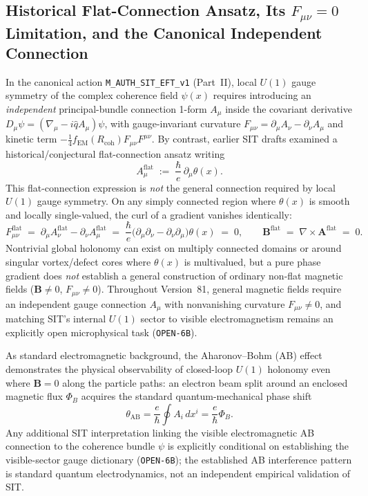 \subsection{Historical Flat-Connection Ansatz, Its $F_{\mu\nu} = 0$ Limitation, and the Canonical Independent Connection}

In the canonical action \texttt{M\_AUTH\_SIT\_EFT\_v1} (Part~II), local $U(1)$ gauge symmetry of the complex coherence field $\psi(x)$ requires introducing an \emph{independent} principal-bundle connection 1-form $A_\mu$ inside the covariant derivative $D_\mu\psi = (\nabla_\mu - i\hat{q}A_\mu)\psi$, with gauge-invariant curvature $F_{\mu\nu} = \partial_\mu A_\nu - \partial_\nu A_\mu$ and kinetic term $-\frac{1}{4}f_{\mathrm{EM}}(R_{\mathrm{coh}})F_{\mu\nu}F^{\mu\nu}$. By contrast, earlier SIT drafts examined a historical/conjectural flat-connection ansatz writing
\begin{equation}
   A_\mu^{\mathrm{flat}} \; := \; \frac{\hbar}{e}\,\partial_\mu\theta(x).
\end{equation}
This flat-connection expression is \emph{not} the general connection required by local $U(1)$ gauge symmetry. On any simply connected region where $\theta(x)$ is smooth and locally single-valued, the curl of a gradient vanishes identically:
\begin{equation}
   F_{\mu\nu}^{\mathrm{flat}} \;=\; \partial_\mu A_\nu^{\mathrm{flat}} - \partial_\nu A_\mu^{\mathrm{flat}}
   \;=\; \frac{\hbar}{e}\bigl(\partial_\mu\partial_\nu - \partial_\nu\partial_\mu\bigr)\theta(x) \;=\; 0,
   \qquad
   \mathbf{B}^{\mathrm{flat}} \;=\; \nabla \times \mathbf{A}^{\mathrm{flat}} \;=\; 0.
\end{equation}
Nontrivial global holonomy can exist on multiply connected domains or around singular vortex/defect cores where $\theta(x)$ is multivalued, but a pure phase gradient does \emph{not} establish a general construction of ordinary non-flat magnetic fields ($\mathbf{B} \ne 0$, $F_{\mu\nu} \ne 0$). Throughout Version~81, general magnetic fields require an independent gauge connection $A_\mu$ with nonvanishing curvature $F_{\mu\nu} \ne 0$, and matching SIT's internal $U(1)$ sector to visible electromagnetism remains an explicitly open microphysical task (\texttt{OPEN-6B}).

As standard electromagnetic background, the Aharonov--Bohm (AB) effect demonstrates the physical observability of closed-loop $U(1)$ holonomy even where $\mathbf{B} = 0$ along the particle paths: an electron beam split around an enclosed magnetic flux $\Phi_B$ acquires the standard quantum-mechanical phase shift
\[
  \theta_{\text{AB}}
  =
  \frac{e}{\hbar}\oint A_i\,dx^i = \frac{e}{\hbar}\Phi_B.
\]
Any additional SIT interpretation linking the visible electromagnetic AB connection to the coherence bundle $\psi$ is explicitly conditional on establishing the visible-sector gauge dictionary (\texttt{OPEN-6B}); the established AB interference pattern is standard quantum electrodynamics, not an independent empirical validation of SIT.

